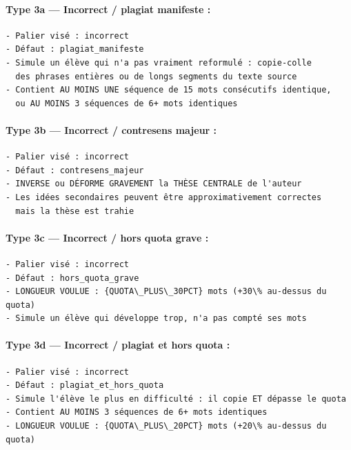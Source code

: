 \paragraph{Type 3a — Incorrect / plagiat manifeste :}
\begin{lstlisting}[caption=Prompt utilisateur — incorrect (plagiat manifeste)]
- Palier visé : incorrect
- Défaut : plagiat_manifeste
- Simule un élève qui n'a pas vraiment reformulé : copie-colle
  des phrases entières ou de longs segments du texte source
- Contient AU MOINS UNE séquence de 15 mots consécutifs identique,
  ou AU MOINS 3 séquences de 6+ mots identiques
\end{lstlisting}

\paragraph{Type 3b — Incorrect / contresens majeur :}
\begin{lstlisting}[caption=Prompt utilisateur — incorrect (contresens majeur)]
- Palier visé : incorrect
- Défaut : contresens_majeur
- INVERSE ou DÉFORME GRAVEMENT la THÈSE CENTRALE de l'auteur
- Les idées secondaires peuvent être approximativement correctes
  mais la thèse est trahie
\end{lstlisting}

\paragraph{Type 3c — Incorrect / hors quota grave :}
\begin{lstlisting}[caption=Prompt utilisateur — incorrect (hors quota grave)]
- Palier visé : incorrect
- Défaut : hors_quota_grave
- LONGUEUR VOULUE : {QUOTA\_PLUS\_30PCT} mots (+30\% au-dessus du quota)
- Simule un élève qui développe trop, n'a pas compté ses mots
\end{lstlisting}

\paragraph{Type 3d — Incorrect / plagiat et hors quota :}
\begin{lstlisting}[caption=Prompt utilisateur — incorrect (plagiat + hors quota)]
- Palier visé : incorrect
- Défaut : plagiat_et_hors_quota
- Simule l'élève le plus en difficulté : il copie ET dépasse le quota
- Contient AU MOINS 3 séquences de 6+ mots identiques
- LONGUEUR VOULUE : {QUOTA\_PLUS\_20PCT} mots (+20\% au-dessus du quota)
\end{lstlisting}

